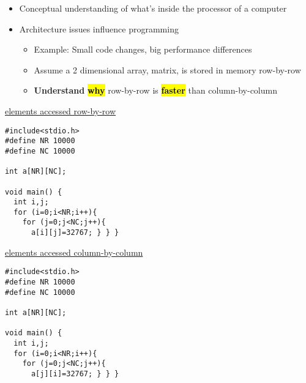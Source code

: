 \begin{frame}[fragile]
\begin{itemize}
    \item Conceptual understanding of what's inside the processor of a computer
    \item Architecture issues influence programming
    \begin{itemize}
    \item Example: Small code changes, big performance differences
    \item Assume a 2 dimensional array, matrix, is stored in memory row-by-row
 \item \textbf{Understand} \hl{\textbf{why}} row-by-row is \hl{\textbf{faster}} than column-by-column
   \end{itemize}
\end{itemize}
\begin{multicols}{2}
{\footnotesize
\underline{elements accessed row-by-row}
\bigskip
\begin{verbatim}
#include<stdio.h> 
#define NR 10000 
#define NC 10000 

int a[NR][NC]; 

void main() { 
  int i,j; 
  for (i=0;i<NR;i++){ 
    for (j=0;j<NC;j++){ 
      a[i][j]=32767; } } }
\end{verbatim}

\columnbreak
\underline{elements accessed column-by-column}

\begin{verbatim}
#include<stdio.h> 
#define NR 10000 
#define NC 10000 

int a[NR][NC]; 

void main() { 
  int i,j; 
  for (i=0;i<NR;i++){ 
    for (j=0;j<NC;j++){ 
      a[j][i]=32767; } } }
\end{verbatim}

}
\end{multicols}




\end{frame}
